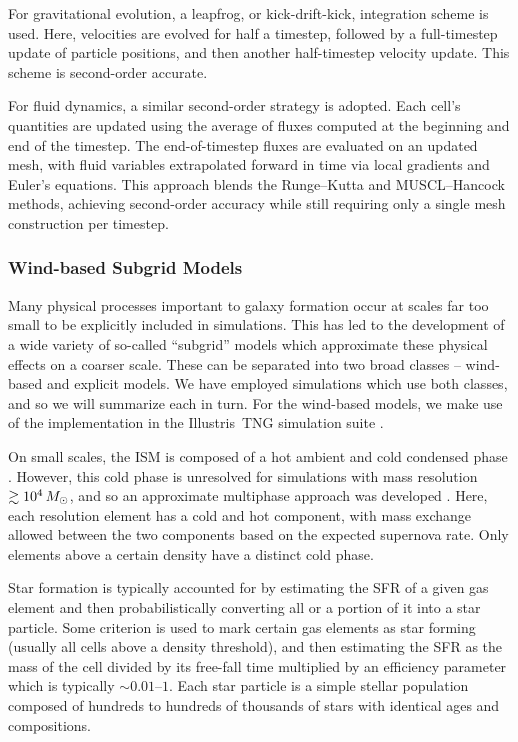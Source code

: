 For gravitational evolution, a leapfrog, or kick-drift-kick, integration scheme is used. Here, velocities are evolved for half a timestep, followed by a full-timestep update of particle positions, and then another half-timestep velocity update. This scheme is second-order accurate.

For fluid dynamics, a similar second-order strategy is adopted. Each cell's quantities are updated using the average of fluxes computed at the beginning and end of the timestep. The end-of-timestep fluxes are evaluated on an updated mesh, with fluid variables extrapolated forward in time via local gradients and Euler's equations. This approach blends the Runge–Kutta and MUSCL–Hancock methods, achieving second-order accuracy while still requiring only a single mesh construction per timestep.

\subsubsection{Wind-based Subgrid Models}
Many physical processes important to galaxy formation occur at scales far too small to be explicitly included in simulations. This has led to the development of a wide variety of so-called ``subgrid'' models which approximate these physical effects on a coarser scale. These can be separated into two broad classes -- wind-based and explicit models. We have employed simulations which use both classes, and so we will summarize each in turn. For the wind-based models, we make use of the implementation in the Illustris~TNG simulation suite \citep{2003MNRAS.339..289S,2013MNRAS.436.3031V,2014MNRAS.444.1518V,2017MNRAS.465.3291W,2018MNRAS.473.4077P}.

On small scales, the ISM is composed of a hot ambient and cold condensed phase \citep{1977ApJ...218..148M}. However, this cold phase is unresolved for simulations with mass resolution $\gtrsim10^4\,M_{\odot}$, and so an approximate multiphase approach was developed \citep{2003MNRAS.339..289S}. Here, each resolution element has a cold and hot component, with mass exchange allowed between the two components based on the expected supernova rate. Only elements above a certain density have a distinct cold phase.

Star formation is typically accounted for by estimating the SFR of a given gas element and then probabilistically converting all or a portion of it into a star particle. Some criterion is used to mark certain gas elements as star forming (usually all cells above a density threshold), and then estimating the SFR as the mass of the cell divided by its free-fall time multiplied by an efficiency parameter which is typically $\sim0.01$--$1$. Each star particle is a simple stellar population composed of hundreds to hundreds of thousands of stars with identical ages and compositions.


